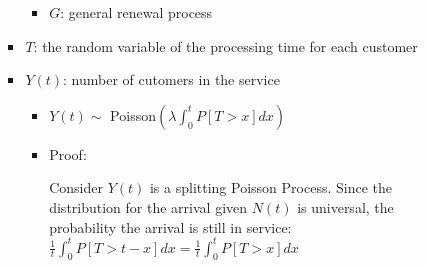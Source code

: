 \documentclass[a4paper]{article}
\begin{document}
\begin{itemize}
\begin{itemize}
\begin{itemize}
\begin{itemize}
                            \item $G$: general renewal process
                        \end{itemize}
                    \item $T$: the random variable of the processing time for each customer
                    \item $Y(t)$: number of cutomers in the service
                        \begin{itemize}
                            \item $Y(t) \sim$ Poisson$(\lambda \int_0^t P[T>x] dx)$
                            \item Proof:

                                Consider $Y(t)$ is a splitting Poisson Process. Since the distribution for the arrival given $N(t)$ is universal, the probability the arrival is still in service: $\frac{1}{t} \int_0^t P[T > t-x] dx = \frac{1}{t}\int_0^t P[T > x] dx$
                        \end{itemize}
                \end{itemize}
        \end{itemize}
\end{itemize}
\end{document}
